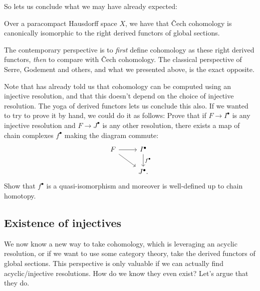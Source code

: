 \documentclass[11pt]{amsart}
\begin{document}
So  lets us conclude what we may have already expected:

\begin{corollary}\label{cor:cech-equals-sheaf-cohomology-paracompact-Hausdorff} 
Over a paracompact Hausdorff space $X$, we have that \v{C}ech cohomology is canonically isomorphic to the right derived functors of global sections.
\end{corollary}

\begin{remark} The contemporary perspective is to \emph{first} define cohomology as these right derived functors, \emph{then} to compare with \v{C}ech cohomology. The classical perspective of Serre, Godement and others, and what we presented above, is the exact opposite.
\end{remark}

\begin{exercise} Note that  has already told us that cohomology can be computed using an injective resolution, and that this doesn't depend on the choice of injective resolution. The yoga of derived functors lets us conclude this also. If we wanted to try to prove it by hand, we could do it as follows: Prove that if $F \to I^\bullet$ is any injective resolution and $F \to J^\bullet$ is any other resolution, there exists a map of chain complexes $f^\bullet$ making the diagram commute:
\[ \begin{tikzcd}
    F\rar\ar[dr] & I^\bullet\dar["f^\bullet" right]\\
     & J^\bullet.
\end{tikzcd}\]
Show that $f^\bullet$ is a quasi-isomorphism and moreover is well-defined up to chain homotopy.
\end{exercise}

\subsection{Existence of injectives}

We now know a new way to take cohomology, which is leveraging an acyclic resolution, or if we want to use some category theory, take the derived functors of global sections. This perspective is only valuable if we can actually find acyclic/injective resolutions. How do we know they even exist? Let's argue that they do.
\end{document}
